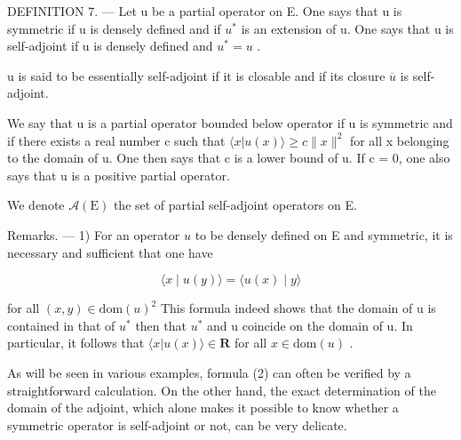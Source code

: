 DEFINITION 7. --- Let u be a partial operator on E. One says that u is symmetric if u is densely defined and if \(u^{*}\) is an extension of u. One says that u is self-adjoint if u is densely defined and \(u^{*} = u\) .

u is said to be essentially self-adjoint if it is closable and if its closure \(\overline{u}\) is self-adjoint.

We say that u is a partial operator bounded below operator if u is symmetric and if there exists a real number c such that \(\langle x | u(x) \rangle \geqslant c \|x\|^{2}\) for all x belonging to the domain of u. One then says that c is a lower bound of u. If c = 0, one also says that u is a positive partial operator.

We denote \(\mathcal{A}(\mathrm{E})\) the set of partial self-adjoint operators on E.

Remarks. --- 1) For an operator \(u\) to be densely defined on E and symmetric, it is necessary and sufficient that one have

\[
\langle x \mid u (y) \rangle = \langle u (x) \mid y \rangle\tag{2}
\]

for all \((x,y)\in\mathrm{dom}(u)^{2}\) This formula indeed shows that the domain of u is contained in that of \(u^{*}\) then that \(u^{*}\) and u coincide on the domain of u. In particular, it follows that \(\langle x|u(x)\rangle\in\mathbf{R}\) for all \(x\in\mathrm{dom}(u)\) .

As will be seen in various examples, formula (2) can often be verified by a straightforward calculation. On the other hand, the exact determination of the domain of the adjoint, which alone makes it possible to know whether a symmetric operator is self-adjoint or not, can be very delicate.

